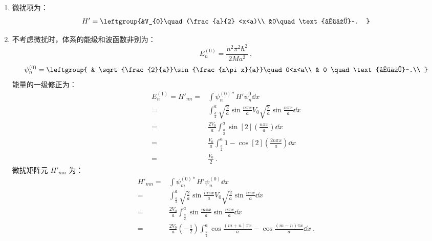 \subsection{ }
\begin{enumerate}
\item 微扰项为：
\begin{equation}
H'=\leftgroup{&V_{0}\quad (\frac{a}{2} <x<a)\\
&0\quad \text{其他}~.
}
\end{equation}
\item 不考虑微扰时，体系的能级和波函数非别为：
\begin{equation}
E^{(0)}_{n}=\frac{n^2 \pi^2 \hbar^2}{2Ma^2}~,
\end{equation}
\begin{equation}
\psi^{(0)}_{n}=\leftgroup{
    & \sqrt{\frac{2}{a}}\sin{\frac{n\pi x}{a}}\quad 0<x<a\\
    & 0 \quad \text{其他}~.\\
}
\end{equation}
能量的一级修正为：
\begin{equation}
\begin{aligned}
E^{(1)}_{n}=H'_{nn}=&\int \psi^{(0)*}_{n}H'\psi^{0}_{n} \dd{x}\\
=&\int^{a}_{\frac{a}{2}} \sqrt{\frac{2}{a}}\sin{\frac{n\pi x}{a}}V_{0}\sqrt{\frac{2}{a}}\sin{\frac{n\pi x}{a}} \dd{x}\\
=&\frac{2V_{0}}{a}\int^{a}_{\frac{a}{2}} \sin[2](\frac{n\pi x}{a}) \dd{x} \\
=&\frac{V_{0}}{a}\int^{a}_{\frac{a}{2}} 1-\cos[2](\frac{2n\pi x}{a}) \dd{x} \\
=&\frac{V_{0}}{2}~.
\end{aligned}
\end{equation}
微扰矩阵元 $H'_{mn}$ 为：
\begin{equation}
\begin{aligned}
H'_{mn}=&\int \psi^{(0)*}_{m}H'\psi^{(0)}_{n} \dd{x} \\
=&\int^{a}_{\frac{a}{2}} \sqrt{\frac{2}{a}} \sin{\frac{m\pi x}{a}} V_{0} \sqrt{\frac{2}{a}} \sin{\frac{n\pi x}{a}} \dd{x} \\
=&\frac{2V_{0}}{a}\int^{a}_{\frac{a}{2}} \sin{\frac{m\pi x}{a}} \sin{\frac{n\pi x}{a}} \dd{x} \\
=&\frac{2V_{0}}{a}(-\frac{1}{2})\int^{a}_{\frac{a}{2}} \cos{\frac{(m+n)\pi x}{a}}-\cos{\frac{(m-n)\pi x}{a}} \dd{x}~.
\end{aligned}
\end{equation}
\end{enumerate}
